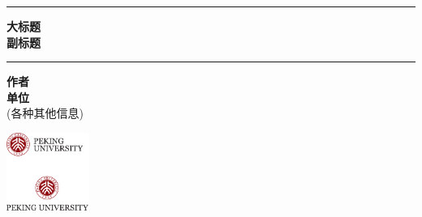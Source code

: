 \begin{titlepage}
    \noindent\begin{center}\rule{\linewidth}{2pt}\end{center}
    \vspace{0.5em}
    \begin{center}
        {\fontsize{48}{48}\selectfont\bfseries\sffamily{} 大标题} \\ \vspace{1.25cm}
        {\fontsize{36}{36}\selectfont\bfseries\sffamily{} 副标题}
    \end{center}
    \noindent\begin{center}\rule{\linewidth}{2pt}\end{center}
    \vspace{1em}
    \begin{center}
        {\Large\bfseries 作者} \\ \vspace{1em}
        {\Large\bfseries 单位} \\ \vspace{1.5em}
        (各种其他信息)
    \end{center}
    \vfill
    \begin{center} \href{https://english.pku.edu.cn/}{\includegraphics[height=72pt]{logo.pdf}} \end{center}
\end{titlepage}